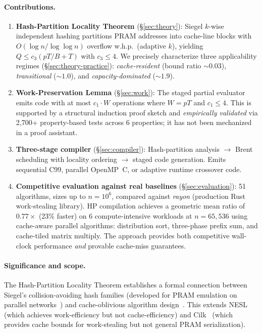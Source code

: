 \documentclass[11pt]{article}
\begin{document}
\paragraph{Contributions.}
\begin{enumerate}[leftmargin=*]
\item \textbf{Hash-Partition Locality Theorem}
  (\S\ref{sec:theory}): Siegel $k$-wise independent hashing partitions
  PRAM addresses into cache-line blocks with $O(\log n / \log\log n)$
  overflow w.h.p.\ (adaptive $k$), yielding $Q \le c_3(pT/B + T)$
  with $c_3 \le 4$.  We precisely characterize three applicability
  regimes (\S\ref{sec:theory-practice}): \emph{cache-resident}
  (bound ratio ${\sim}0.03$), \emph{transitional} (${\sim}1.0$), and
  \emph{capacity-dominated} (${\sim}1.9$).

\item \textbf{Work-Preservation Lemma} (\S\ref{sec:work}): The
  staged partial evaluator emits code with at most $c_1 \cdot W$
  operations where $W = pT$ and $c_1 \le 4$.  This is supported by a
  structural induction proof sketch and \emph{empirically validated}
  via 2,700+ property-based tests across 6 properties; it has not been
  mechanized in a proof assistant.

\item \textbf{Three-stage compiler} (\S\ref{sec:compiler}):
  Hash-partition analysis $\to$ Brent scheduling with locality
  ordering $\to$ staged code generation.  Emits sequential C99,
  parallel OpenMP~C, or adaptive runtime crossover code.

\item \textbf{Competitive evaluation against real baselines}
  (\S\ref{sec:evaluation}): 51 algorithms, sizes up to $n = 10^6$,
  compared against \emph{rayon} (production Rust work-stealing
  library).  HP compilation achieves a geometric mean ratio of
  $0.77\times$ (23\% faster) on 6 compute-intensive workloads at
  $n = 65{,}536$ using cache-aware parallel algorithms: distribution
  sort, three-phase prefix sum, and cache-tiled matrix multiply.
  The approach provides both competitive wall-clock performance
  \emph{and} provable cache-miss guarantees.
\end{enumerate}

\paragraph{Significance and scope.}
The Hash-Partition Locality Theorem establishes a formal connection
between Siegel's collision-avoiding hash families (developed for PRAM
emulation on parallel networks~\cite{siegel2004universal}) and
cache-oblivious algorithm design~\cite{frigo1999cache}.  This extends
NESL~\cite{blelloch1996programming} (which achieves work-efficiency but
not cache-efficiency) and Cilk~\cite{frigo1998implementation} (which
provides cache bounds for work-stealing but not general PRAM
serialization).
\end{document}
